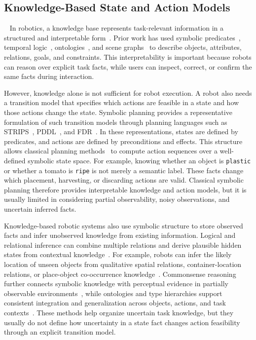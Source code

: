 \subsection{Knowledge-Based State and Action Models}~\label{rel:kb}
In robotics, a knowledge base represents task-relevant information in a structured and interpretable form~\cite{brachman2004knowledge,russell1995modern}. Prior work has used symbolic predicates~\cite{fikes1971strips,aeronautiques1998pddl}, temporal logic~\cite{liu2020graph}, ontologies~\cite{mitrevsk2021ontology}, and scene graphs~\cite{johnson2015image,armeni20193d} to describe objects, attributes, relations, goals, and constraints. This interpretability is important because robots can reason over explicit task facts, while users can inspect, correct, or confirm the same facts during interaction.


However, knowledge alone is not sufficient for robot execution. A robot also needs a transition model that specifies which actions are feasible in a state and how those actions change the state. Symbolic planning provides a representative formulation of such transition models through planning languages such as STRIPS~\cite{fikes1971strips}, PDDL~\cite{aeronautiques1998pddl}, and FDR~\cite{helmert2009concise}. In these representations, states are defined by predicates, and actions are defined by preconditions and effects. This structure allows classical planning methods~\cite{hoffmann2001ff,helmert2006fast,correa2024lifted} to compute action sequences over a well-defined symbolic state space. For example, knowing whether an object is \texttt{plastic} or whether a tomato is \texttt{ripe} is not merely a semantic label. These facts change which placement, harvesting, or discarding actions are valid. Classical symbolic planning therefore provides interpretable knowledge and action models, but it is usually limited in considering partial observability, noisy observations, and uncertain inferred facts.


Knowledge-based robotic systems also use symbolic structure to store observed facts and infer unobserved knowledge from existing information. Logical and relational inference can combine multiple relations and derive plausible hidden states from contextual knowledge~\cite{tenorth2012knowledge,liu2020graph}. For example, robots can infer the likely location of unseen objects from qualitative spatial relations, container-location relations, or place-object co-occurrence knowledge~\cite{kunze2014using,hasegawa2023inferring}. Commonsense reasoning further connects symbolic knowledge with perceptual evidence in partially observable environments~\cite{mota2021integrated,zhang2024icorpp,daruna2019robocse}, while ontologies and type hierarchies support consistent integration and generalization across objects, actions, and task contexts~\cite{mitrevsk2021ontology,olivares2019review,manzoor2021ontology}. These methods help organize uncertain task knowledge, but they usually do not define how uncertainty in a state fact changes action feasibility through an explicit transition model.

